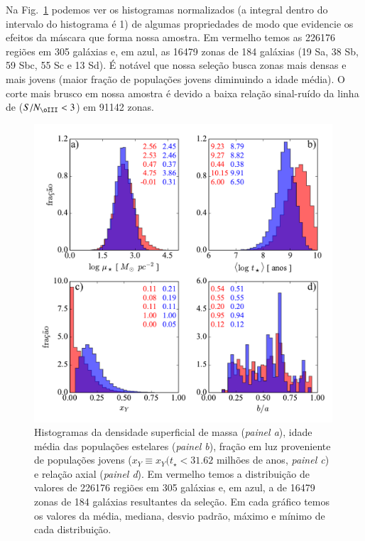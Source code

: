 Na Fig.\ \ref{fig:histosample} podemos ver os histogramas normalizados (a integral dentro do
intervalo do histograma é 1) de algumas propriedades de modo que evidencie os efeitos da máscara
que forma nossa amostra. Em vermelho temos as 226176 regiões em 305 galáxias e, em azul, as 16479
zonas de 184 galáxias (19 Sa, 38 Sb, 59 Sbc, 55 Sc e 13 Sd). É notável que nossa seleção busca zonas
mais densas e mais jovens (maior fração de populações jovens diminuindo a idade média). O corte mais
brusco em nossa amostra é devido a baixa relação sinal-ruído da linha de \oIII ($S/N_{\oIII} < 3$)
em 91142 zonas.
\begin{figure}
	\centering
	\includegraphics[width=0.99\textwidth]{figuras/histosample.pdf}
	\caption[Histogramas: densidade superficial de massa, idade média, fração de populações jovens e
	relação axial.]
	{Histogramas da densidade superficial de massa ({\em painel a}), idade média das populações
estelares ({\em painel b}), fração em luz proveniente de populações jovens ($x_Y \equiv x_Y(t_\star <
31.62$ milhões de anos, {\em painel c}) e relação axial ({\em painel d}). Em vermelho temos a
distribuição de valores de 226176 regiões em 305 galáxias e, em azul, a de 16479 zonas de 184
galáxias resultantes da seleção. Em cada gráfico temos os valores da média, mediana, desvio padrão,
máximo e mínimo de cada distribuição.}
	\label{fig:histosample}
\end{figure}

